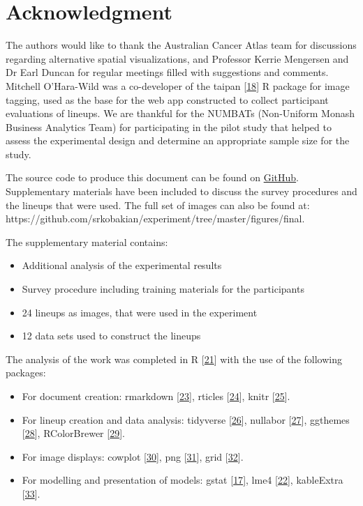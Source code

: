 \documentclass[conference,final,]{IEEEtran}
\providecommand{\tightlist}{%
  \setlength{\itemsep}{0pt}\setlength{\parskip}{0pt}}
\begin{document}
\hypertarget{acknowledgment}{%
\section{Acknowledgment}\label{acknowledgment}}

The authors would like to thank the Australian Cancer Atlas team for discussions regarding alternative spatial visualizations, and Professor Kerrie Mengersen and Dr Earl Duncan for regular meetings filled with suggestions and comments. Mitchell O'Hara-Wild was a co-developer of the taipan {[}\protect\hyperlink{ref-taipan}{18}{]} R package for image tagging, used as the base for the web app constructed to collect participant evaluations of lineups. We are thankful for the NUMBATs (Non-Uniform Monash Business Analytics Team) for participating in the pilot study that helped to assess the experimental design and determine an appropriate sample size for the study.

The source code to produce this document can be found on \href{https://github.com/srkobakian/experiment/tree/master/paper}{GitHub}.
Supplementary materials have been included to discuss the survey procedures and the lineups that were used.
The full set of images can also be found at: https://github.com/srkobakian/experiment/tree/master/figures/final.

The supplementary material contains:

\begin{itemize}
\tightlist
\item
  Additional analysis of the experimental results
\item
  Survey procedure including training materials for the participants
\item
  24 lineups as images, that were used in the experiment
\item
  12 data sets used to construct the lineups
\end{itemize}

The analysis of the work was completed in R {[}\protect\hyperlink{ref-RCore}{21}{]} with the use of the following packages:

\begin{itemize}
\tightlist
\item
  For document creation: rmarkdown {[}\protect\hyperlink{ref-rmarkdown}{23}{]}, rticles {[}\protect\hyperlink{ref-rticles}{24}{]}, knitr {[}\protect\hyperlink{ref-knitr}{25}{]}.
\item
  For lineup creation and data analysis: tidyverse {[}\protect\hyperlink{ref-tidyverse}{26}{]}, nullabor {[}\protect\hyperlink{ref-nullabor}{27}{]}, ggthemes {[}\protect\hyperlink{ref-ggthemes}{28}{]}, RColorBrewer {[}\protect\hyperlink{ref-RColorBrewer}{29}{]}.
\item
  For image displays: cowplot {[}\protect\hyperlink{ref-cowplot}{30}{]}, png {[}\protect\hyperlink{ref-png}{31}{]}, grid {[}\protect\hyperlink{ref-grid}{32}{]}.
\item
  For modelling and presentation of models: gstat {[}\protect\hyperlink{ref-gstat}{17}{]}, lme4 {[}\protect\hyperlink{ref-lme4}{22}{]}, kableExtra {[}\protect\hyperlink{ref-kableExtra}{33}{]}.
\end{itemize}
\end{document}
